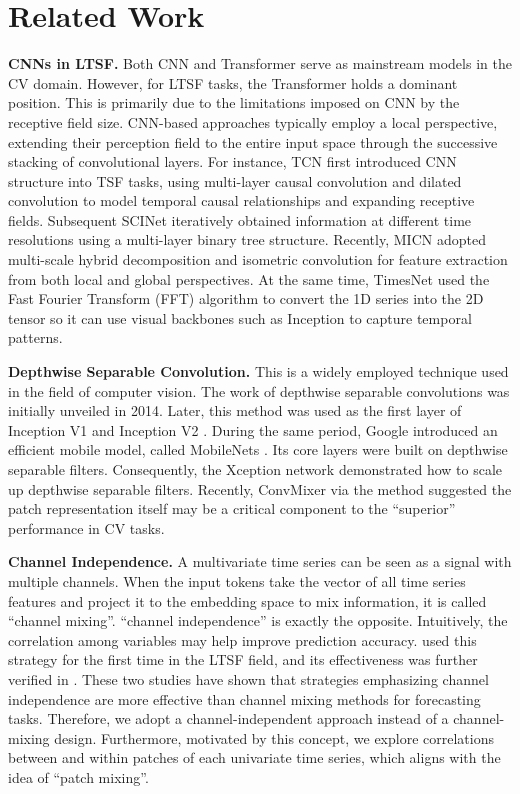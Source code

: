 \documentclass{article} \usepackage{iclr2024_conference,times}
\begin{document}
\section{Related Work}
\label{sec::related_work}
\textbf{CNNs in LTSF.}  Both CNN and Transformer serve as mainstream models in the CV domain. However, for LTSF tasks, the Transformer holds a dominant position. This is primarily due to the limitations imposed on CNN by the receptive field size. CNN-based approaches typically employ a local perspective, extending their perception field to the entire input space through the successive stacking of convolutional layers. For instance, TCN \citep{tcn} first introduced CNN structure into TSF tasks, using multi-layer causal convolution and dilated convolution to model temporal causal relationships and expanding receptive fields. Subsequent SCINet \citep{scinet} iteratively obtained information at different time resolutions using a multi-layer binary tree structure. Recently, MICN \citep{micn} adopted multi-scale hybrid decomposition and isometric convolution for feature extraction from both local and global perspectives. At the same time, TimesNet \citep{timesnet} used the Fast Fourier Transform (FFT) algorithm to convert the 1D series into the 2D tensor so it can use visual backbones such as Inception \citep{inceptionv1} to capture temporal patterns.  



\textbf{Depthwise Separable Convolution.} This is a widely employed technique used in the field of computer vision. 
The work of depthwise separable convolutions was initially unveiled \citep{van2018learning} in 2014. Later, this method was used as the first layer of Inception V1 \citep{inceptionv1} and Inception V2 \citep{inceptionv2}. During the same period, Google introduced an efficient mobile model, called MobileNets \citep{mobilenets}. Its core layers were built on depthwise separable filters. Consequently, the Xception \citep{xception} network demonstrated how to scale up depthwise separable filters. Recently, ConvMixer \citep{convmixer} via the method suggested the patch representation itself may be a critical component to the ``superior'' performance in CV tasks. 



\textbf{Channel Independence.} A multivariate time series can be seen as a signal with multiple channels. When the input tokens take the vector of all time series features and project it to the embedding space to mix information, it is called ``channel mixing''. ``channel independence'' is exactly the opposite. Intuitively, the correlation among variables may help improve prediction accuracy. \citet{dlinear} used this strategy for the first time in the LTSF field, and its effectiveness was further verified in \citet{patchtst}. These two studies have shown that strategies emphasizing channel independence are more effective than channel mixing methods for forecasting tasks. Therefore, we adopt a channel-independent approach instead of a channel-mixing design. Furthermore, motivated by this concept, we explore correlations between and within patches of each univariate time series, which aligns with the idea of ``patch mixing''.
\end{document}
